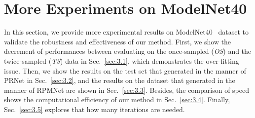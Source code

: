 \documentclass[10pt,twocolumn,letterpaper]{article}
\begin{document}
\begin{table}[t]
    \small
    \centering
    \caption{Results on 8 axisymmetrical categories in ModelNet40. \emph{OS} and \emph{TS} denotes the results on the once-sampled and our twice-sampled data separately. The performances of all methods are decreasing when changing the data sampling manner from \emph{OS} to \emph{TS}.}
    \label{tab:over-fitting}
\end{table}  
\section{More Experiments on ModelNet40}
\label{sec:3}
In this section, we provide more experimental results on ModelNet40~\cite{wu20153d} dataset to validate the robustness and effectiveness of our method. First, we show the decrement of performances between evaluating on the once-sampled (\emph{OS}) and the twice-sampled (\emph{TS}) data in Sec.~\ref{sec:3.1}, which demonstrates the over-fitting issue. Then, we show the results on the test set that generated in the manner of PRNet in Sec.~\ref{sec:3.2}, and the results on the dataset that generated in the manner of RPMNet are shown in Sec.~\ref{sec:3.3}. Besides, the comparison of speed shows the computational efficiency of our method in Sec.~\ref{sec:3.4}. Finally, Sec.~\ref{sec:3.5} explores that how many iterations are needed.
\end{document}
